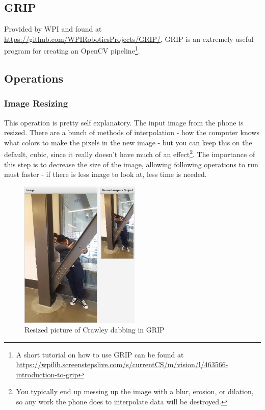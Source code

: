 \documentclass[../main.tex]{subfiles}
\begin{document}
\subsection{GRIP}
Provided by WPI and found at \url{https://github.com/WPIRoboticsProjects/GRIP/}, GRIP is an extremely useful program for creating an OpenCV pipeline\footnote{A short tutorial on how to use GRIP can be found at \url{https://wpilib.screenstepslive.com/s/currentCS/m/vision/l/463566-introduction-to-grip}}.
\subsection{Operations}
\subsubsection{Image Resizing}
This operation is pretty self explanatory. The input image from the phone is resized. There are a bunch of methods of interpolation - how the computer knows what colors to make the pixels in the new image - but you can keep this on the default, cubic, since it really doesn't have much of an effect\footnote{You typically end up messing up the image with a blur, erosion, or dilation, so any work the phone does to interpolate data will be destroyed.}. The importance of this step is to decrease the size of the image, allowing following operations to run must faster - if there is less image to look at, less time is needed.
\begin{figure}[H]
    \centering
    \includegraphics[height=200pt]{sections/vision/images/opencv/crawley/crawleyResize.png}
    \caption{Resized picture of Crawley dabbing in GRIP}
\end{figure}
\end{document}
